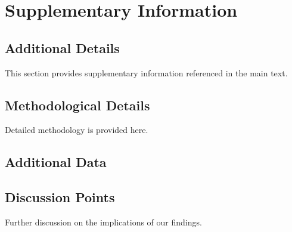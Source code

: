 \documentclass{article}
\begin{document}
\section{Supplementary Information}

\subsection{Additional Details}\label{sec:additional_info}

This section provides supplementary information referenced in the main text.

\subsection{Methodological Details}\label{sec:method_details}

Detailed methodology is provided here.

\subsection{Additional Data}\label{sec:additional_data}


\subsection{Discussion Points}\label{sec:discussion_points}

Further discussion on the implications of our findings.
\end{document}

